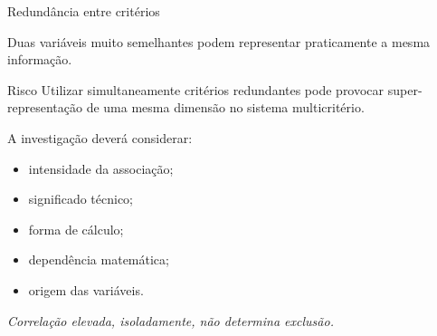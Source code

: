 \begin{frame}{Redundância entre critérios}

    Duas variáveis muito semelhantes podem representar praticamente
    a mesma informação.

    \vspace{0.3cm}

    \begin{block}{Risco}
        Utilizar simultaneamente critérios redundantes pode provocar
        super-representação de uma mesma dimensão no sistema
        multicritério.
    \end{block}

    \vspace{0.3cm}

    A investigação deverá considerar:

    \begin{itemize}
        \item intensidade da associação;
        \item significado técnico;
        \item forma de cálculo;
        \item dependência matemática;
        \item origem das variáveis.
    \end{itemize}

    \vspace{0.2cm}

    \centering
    \textit{Correlação elevada, isoladamente, não determina exclusão.}

\end{frame}



